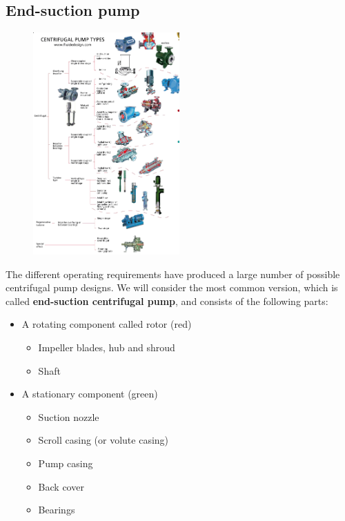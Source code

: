 \documentclass[class=report, crop=false, 12pt,a4paper]{standalone}
\begin{document}
\subsection{End-suction pump}
\begin{figure}[H]
  \centering
  \includegraphics[width = 0.5\textwidth]{../img/diagram3.png}
\end{figure}
The different operating requirements have produced a large number of possible centrifugal pump designs. We will consider the most common version, which is called \textbf{end-suction centrifugal pump}, and consists of the following parts:
\begin{itemize}
  \item A rotating component called rotor (red)
  \begin{itemize}
    \item Impeller blades, hub and shroud
    \item Shaft
  \end{itemize}
  \item A stationary component (green)
  \begin{itemize}
    \item Suction nozzle
    \item Scroll casing (or volute casing)
    \item Pump casing
    \item Back cover
    \item Bearings
  \end{itemize}
\end{itemize}
\end{document}
